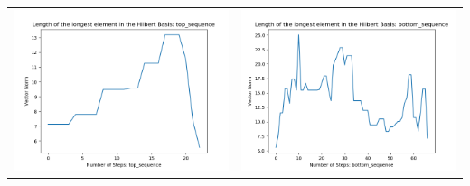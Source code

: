 \documentclass[10pt]{article}
\begin{document}
\begin{tabular}{c|c}
\begin{minipage}{.45\textwidth}
\includegraphics[width=\textwidth]{"DATA/5d/5 generators 2 bound D/top_sequence LENGTH"}
\end{minipage} &
\begin{minipage}{.45\textwidth}
\includegraphics[width=\textwidth]{"DATA/5d/5 generators 2 bound D bottomup/bottom_sequence LENGTH"}
\end{minipage}
\end{tabular}
\end{document}
